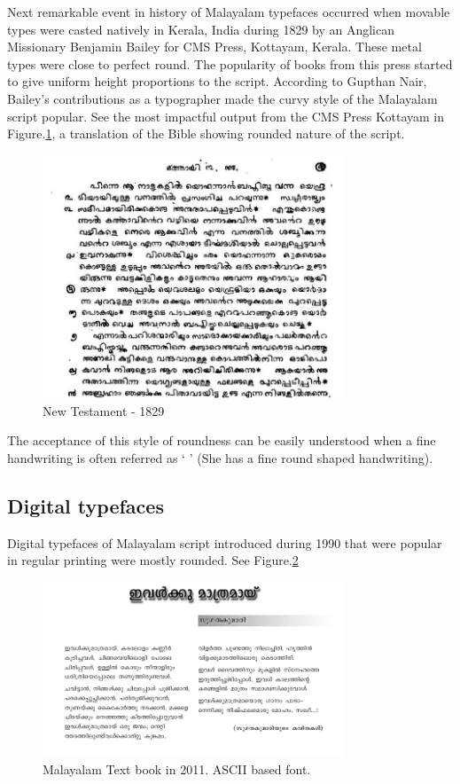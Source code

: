 \documentclass[10pt]{article}
\begin{document}
Next remarkable event in history of Malayalam typefaces occurred when movable types were casted natively in Kerala, India during 1829 by an Anglican Missionary Benjamin Bailey\cite{babucherian} for CMS Press, Kottayam, Kerala. These metal types were close to perfect round. The popularity of books from this press started to give uniform height proportions to the script. According to Gupthan Nair, Bailey's contributions as a typographer made the curvy style of the Malayalam script popular\cite{gupthannair}. See the most impactful output from the CMS Press Kottayam in Figure.\ref{newtestament}, a translation of the Bible showing rounded nature of the script.


\begin{figure}
	\centering
	\includegraphics[width=0.8\textwidth]{images/newtestament1829.png}
	\caption{New Testament - 1829}
	\label{newtestament}
\end{figure}

The acceptance of this style of roundness can be easily understood when a fine handwriting is often referred as `{ }' (She has a fine round shaped handwriting).


\subsection{Digital typefaces}

Digital typefaces of Malayalam script introduced during 1990 that were popular in regular printing were mostly rounded. See Figure.\ref{maltextbook}

\begin{figure}
	\centering
	\includegraphics[width=0.8\textwidth]{images/2011-Malayalam-Textbook.png}
	\caption{Malayalam Text book in 2011. ASCII based font.}
	\label{maltextbook}
\end{figure}
\end{document}

